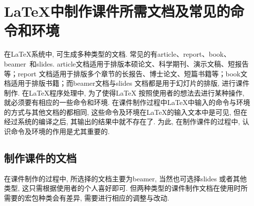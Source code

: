 \section{\LaTeX{}中制作课件所需文档及常见的命令和环境}
在\LaTeX{}系统中, 可生成多种类型的文档. 常见的有article、report、book、beamer~和slides. article文档适用于排版本硕论文、科学期刊、演示文稿、短报告等；report 文档适用于排版多个章节的长报告、博士论文、短篇书籍等；book文档适用于排版书籍；而beamer文档与slides 文档都是用于幻灯片的排版, 进行课件制作. 在\LaTeX{}程序处理中, 为了使得\LaTeX{} 按照使用者的想法去进行某种操作, 就必须要有相应的一些命令和环境. 在课件制作过程中\LaTeX{}中输入的命令与环境的方式与其他文档的都相同, 这些命令及环境在\LaTeX{}的输入文本中是可见, 但在经过系统的编译之后, 其输出的结果中就不存在了. 为此, 在制作课件的过程中, 认识命令及环境的作用是尤其重要的.

\subsection{制作课件的文档}

在课件制作的过程中, 所选择的文档主要为beamer, 当然也可选择slides 或者其他类型, 这只需根据使用者的个人喜好即可. 但两种类型的课件制作文档在使用时所需要的宏包种类会有差异, 需要进行相应的调整与改动.
